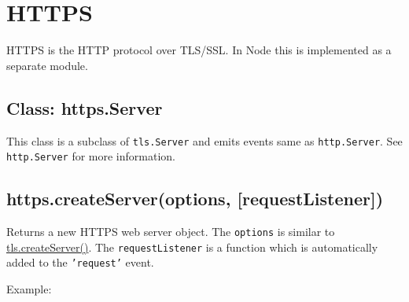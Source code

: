 \section{HTTPS}

\begin{Shaded}
\begin{Highlighting}[]
\NormalTok{: } 
\end{Highlighting}
\end{Shaded}

HTTPS is the HTTP protocol over TLS/SSL. In Node this is implemented as
a separate module.

\subsection{Class: https.Server}

This class is a subclass of \texttt{tls.Server} and emits events same as
\texttt{http.Server}. See \texttt{http.Server} for more information.

\subsection{https.createServer(options, {[}requestListener{]})}

Returns a new HTTPS web server object. The \texttt{options} is similar
to
\href{tls.html\#tls\_tls\_createserver\_options\_secureconnectionlistener}{tls.createServer()}.
The \texttt{requestListener} is a function which is automatically added
to the \texttt{'request'} event.

Example:

\begin{Shaded}
\begin{Highlighting}[]
 \NormalTok{);}
 \NormalTok{);}

 
  \NormalTok{: }\NormalTok{(}\NormalTok{),}
  \NormalTok{: }\NormalTok{(}\NormalTok{)}
\NormalTok{\};}

 
  \NormalTok{(}\NormalTok{);}
  \NormalTok{(}\NormalTok{);}
\NormalTok{(}\NormalTok{);}
\end{Highlighting}
\end{Shaded}

